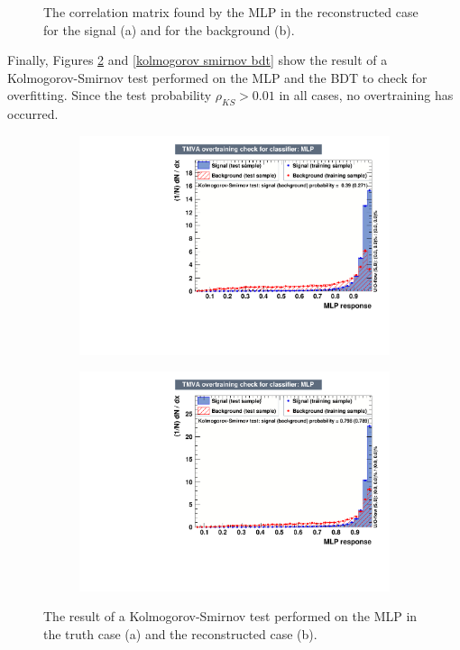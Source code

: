 \documentclass[10pt,a4paper]{book}
\begin{document}
\begin{figure}[h]
\begin{subfigure}{1.0\textwidth}
\caption{}
\end{subfigure}
\caption{The correlation matrix found by the MLP in the reconstructed case for the signal (a) and for the background (b).}
\label{correlation reco}
\end{figure} 

Finally, Figures \ref{kolmogorov smirnov mlp} and \ref{kolmogorov smirnov bdt} show the result of a Kolmogorov-Smirnov test \cite{10.2307/2280095} performed on the MLP and the BDT to check for overfitting. Since the test probability $\rho_{KS} > 0.01$ in all cases, no overtraining has occurred.

\begin{figure}[h]
\begin{subfigure}{0.8\textwidth}
\centering
\includegraphics[scale=0.7]{ch4_images/ks_mlp_truth.pdf}
\caption{}
\end{subfigure}
\begin{subfigure}{0.8\textwidth}
\centering
\includegraphics[scale=0.7]{ch4_images/ks_mlp_reco.pdf}
\caption{}
\end{subfigure}
\caption{The result of a Kolmogorov-Smirnov test performed on the MLP in the truth case (a) and the reconstructed case (b).}
\label{kolmogorov smirnov mlp}
\end{figure} 
\end{document}

